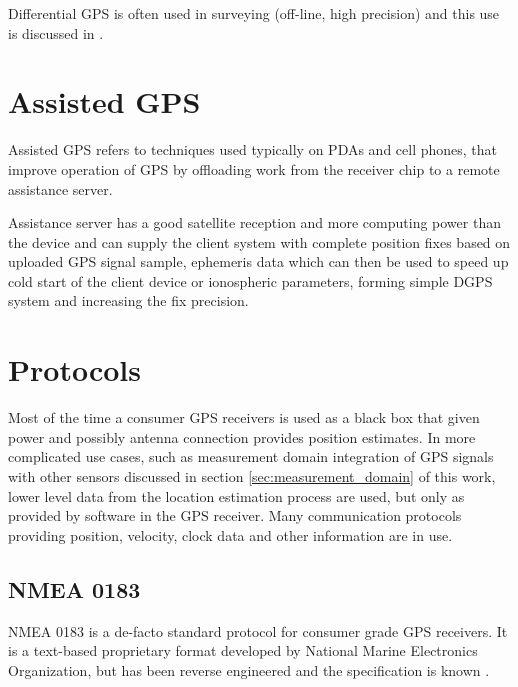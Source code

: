 Differential GPS is often used in surveying (off-line, high precision) and this
use is discussed in \cite{rizos99}.

\section{Assisted GPS}
Assisted GPS refers to techniques used typically on PDAs and cell phones, that improve operation of GPS by offloading
work from the receiver chip to a remote assistance server.

Assistance server has a good satellite reception and more computing power than the device
and can supply the client system with complete position fixes based on uploaded GPS signal sample,
ephemeris data which can then be used to speed up cold start of the client device or
ionospheric parameters, forming simple DGPS system and increasing the fix precision.



\section{Protocols}
Most of the time a consumer GPS receivers is used as a black box that given power and possibly antenna connection
provides position estimates.
In more complicated use cases, such as measurement domain integration of GPS signals with
other sensors discussed in section \ref{sec:measurement_domain} of this work,
lower level data from the location estimation process are used, but only as provided
by software in the GPS receiver.
Many communication protocols providing position, velocity, clock data
and other information are in use.

\subsection{NMEA 0183}
NMEA 0183 is a de-facto standard protocol for consumer grade GPS receivers.
It is a text-based proprietary format developed by National Marine Electronics Organization,
but has been reverse engineered and the specification is known \cite{depriest}.

